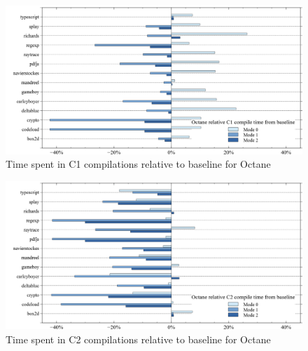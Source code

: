 \begin{figure}[ht]
  \begin{center}
    \centering
    \includegraphics[width=1.0\textwidth]{figures/octane_variation_compiletime_c1.png}
    \caption{Time spent in C1 compilations relative to baseline for Octane}
    \label{f:octane_variation_compiletime_c1}
  \end{center}
\end{figure}
\begin{figure}[ht]
  \begin{center}
    \centering
    \includegraphics[width=1.0\textwidth]{figures/octane_variation_compiletime_c2.png}
    \caption{Time spent in C2 compilations relative to baseline for Octane}
    \label{f:octane_variation_compiletime_c2}
  \end{center}
\end{figure}
\clearpage
